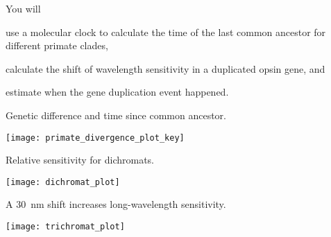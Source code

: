 \documentclass[t]{beamer}
\begin{document}
%
%
\begin{frame}{You will }
	
	\hangpara use a molecular clock to calculate the time of the last common ancestor for different primate clades,
	
	\hangpara calculate the shift of wavelength sensitivity in a duplicated opsin gene, and
	
	\hangpara estimate when the gene duplication event happened.
	
\end{frame}
% 
\begin{frame}{Genetic difference and time since common ancestor.}

\texttt{[image: primate\_divergence\_plot\_key]}
\end{frame}
%
\begin{frame}[t]{Relative sensitivity for dichromats.}

	\vspace{-0.5\baselineskip}

	\texttt{[image: dichromat\_plot]}
	
\end{frame}
%

\begin{frame}[t]{A 30~nm shift increases long-wavelength sensitivity.}
	
	\vspace{-0.5\baselineskip}

	\texttt{[image: trichromat\_plot]}
	
\end{frame}
%

%
\end{document}
